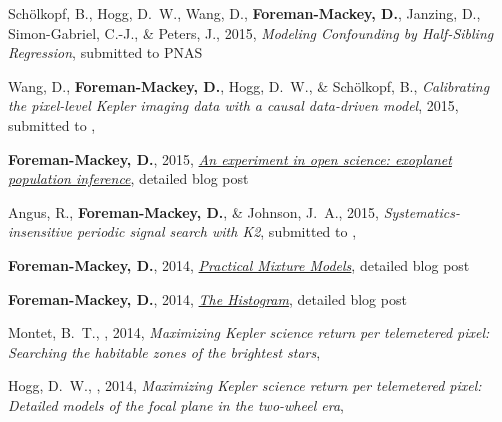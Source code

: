 \item Sch{\"o}lkopf, B., Hogg, D.~W., Wang, D., {\bf Foreman-Mackey, D.},
    Janzing, D., Simon-Gabriel, C.-J., \& Peters, J., 2015,
    \emph{Modeling Confounding by Half-Sibling Regression},
    submitted to PNAS

\item Wang, D., {\bf Foreman-Mackey, D.}, Hogg, D.~W., \& Sch{\"o}lkopf, B.,
    \emph{Calibrating the pixel-level Kepler imaging data with a causal
          data-driven model},
    2015, submitted to \pasp, 

\item {\bf Foreman-Mackey, D.}, 2015,
    \href{http://dan.iel.fm/posts/exopop/}
         {\emph{An experiment in open science: exoplanet population
                inference}},
    detailed blog post

\item Angus, R., {\bf Foreman-Mackey, D.}, \& Johnson, J.~A., 2015,
    \emph{Systematics-insensitive periodic signal search with K2},
    submitted to \apj, 

\item {\bf Foreman-Mackey, D.}, 2014,
    \href{http://dan.iel.fm/posts/mixture-models/}
         {\emph{Practical Mixture Models}},
    detailed blog post

\item {\bf Foreman-Mackey, D.}, 2014,
    \href{http://dan.iel.fm/posts/histogram1/}
         {\emph{The Histogram}},
    detailed blog post

\item Montet, B.~T., \etal, 2014,
    \emph{Maximizing Kepler science return per telemetered pixel: Searching
          the habitable zones of the brightest stars},

\item Hogg, D.~W., \etal, 2014,
    \emph{Maximizing Kepler science return per telemetered pixel: Detailed
          models of the focal plane in the two-wheel era},

